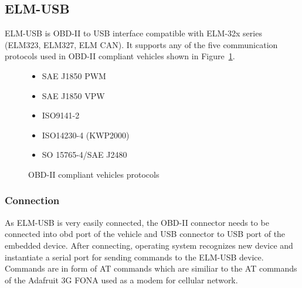 \subsection{ELM-USB} %
\label{sub:elm_usb}
ELM-USB is OBD-II to USB interface compatible with ELM-32x series (ELM323, ELM327, ELM CAN).\cite{elm_site} It supports any of the five communication protocols used in OBD-II compliant vehicles shown in Figure~\ref{fig:obd_protocol}.
\begin{figure}[htbp]
	\centering
	\begin{itemize}
		\item SAE J1850 PWM
		\item SAE J1850 VPW
		\item ISO9141-2
		\item ISO14230-4 (KWP2000)
		\item SO 15765-4/SAE J2480
	\end{itemize}
	\caption{OBD-II compliant vehicles protocols}
	\label{fig:obd_protocol}
\end{figure}
\subsubsection{Connection} %
\label{ssub:connection}
As ELM-USB is very easily connected, the OBD-II connector needs to be connected into \gls{obd} port of the vehicle and USB connector to USB port of the embedded device. After connecting, operating system recognizes new device and instantiate a serial port for sending commands to the ELM-USB device. Commands are in form of AT commands which are similiar to the AT commands of the Adafruit 3G FONA used as a modem for cellular network.
